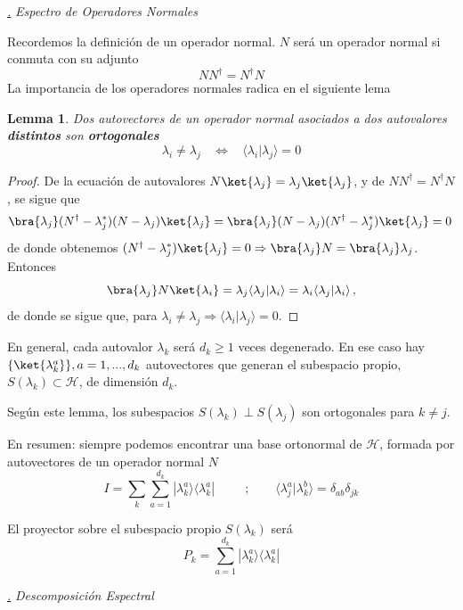 \documentclass[a4paper,11pt]{book} %
\newtheorem{lemma_contador}{Lemma}
\newcommand{\Lemma}[1]{
		\begin{mybox_gray2}{}
			\begin{lemma_contador}
				 #1 
			\end{lemma_contador} 
		\end{mybox_gray2}
	}
\numberwithin{equation}{chapter}
\newcommand{\braket}[2]{\langle #1|#2\rangle}
\newcommand{\ketbra}[2]{| #1\rangle \! \langle #2|}
\def\subsubiContadorIt{\par\addtocounter{subsubsection}{1}\underline{\it\thesubsubsection.}\hskip0.5cm \setcounter{subsubsubsectionIt}{0}}
\newcommand{\SubsubiIt}[1]{
		\subsubiContadorIt \textit{#1}
	}
\newcounter{subsubsubsectionIt}[subsubsection]
\begin{document}
			\SubsubiIt{Espectro de Operadores Normales}

Recordemos la definición de un operador normal. $N$ será un operador normal si conmuta con su adjunto
$$
NN^\dagger = N^\dagger N
$$
La importancia de los operadores normales radica en el siguiente lema     

	\Lemma{
	Dos autovectores de un operador normal asociados a dos autovalores \textbf{distintos}  son \textbf{ortogonales}
	$$
\lambda_i\neq \lambda_j~~~~\Longleftrightarrow ~~~~ \braket{\lambda_i}{\lambda_j} = 0
$$
	}

\begin{proof}
De la ecuación de autovalores $N\ket{\lambda_j} =  \lambda_j \ket{\lambda_j}$, y de $NN^\dagger = N^\dagger N$, se sigue que
$$
\bra{\lambda_j}(N^\dagger - \lambda_j^*)(N - \lambda_j) \ket{\lambda_j} = \bra{\lambda_j}(N - \lambda_j)(N^\dagger - \lambda_j^*) \ket{\lambda_j}  = 0\,
$$
 de donde obtenemos $(N^\dagger - \lambda_j^*) \ket{\lambda_j} = 0 \Rightarrow \bra{\lambda_j} N = \bra{\lambda_j}\lambda_j$. Entonces
$$
\bra{\lambda_j}N\ket{\lambda_i} = \lambda_j \braket{\lambda_j}{\lambda_i} = \lambda_i \braket{\lambda_j}{\lambda_i} \, ,
$$
de donde se sigue que, para $\lambda_i \neq \lambda_j \Rightarrow \braket{\lambda_i}{\lambda_j} = 0$. 
\end{proof}

En general, cada autovalor $\lambda_k$ será $d_k \geq 1$ veces degenerado. En ese caso hay  $\{\ket{\lambda^a_k}\}, a=1,...,d_k$ autovectores que generan el subespacio propio, $S(\lambda_k)\subset \mathcal{H} $, de dimensión $d_k$. 

Según este lemma, los subespacios $S(\lambda_k)\perp S(\lambda_j)$ son ortogonales para $k\neq j$. 

En resumen: siempre podemos encontrar una base  ortonormal de $\mathcal{H}$, formada por autovectores de un operador normal $N$
$$
I = \sum_k\sum_{a=1}^{d_k} \ketbra{\lambda^a_k}{\lambda^a_k} ~~~~~~~~~~~;~~~~~~~~~ \braket{\lambda^a_j}{\lambda^b_k} = \delta_{ab}\delta_{jk}
$$

El proyector sobre el subespacio propio $S(\lambda_k)$ será
$$
P_k = \sum_{a=1}^{d_k} \ketbra{\lambda^a_k}{\lambda^a_k}
$$

			\SubsubiIt{Descomposición Espectral}
\end{document}
